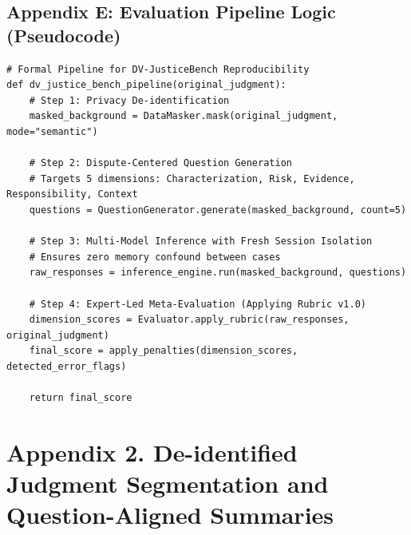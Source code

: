 \hypertarget{appendix-e-evaluation-pipeline-logic-pseudocode}{%
\subsection{Appendix E: Evaluation Pipeline Logic (Pseudocode)}\label{appendix-e-evaluation-pipeline-logic-pseudocode}}

\begin{verbatim}
# Formal Pipeline for DV-JusticeBench Reproducibility
def dv_justice_bench_pipeline(original_judgment):
    # Step 1: Privacy De-identification
    masked_background = DataMasker.mask(original_judgment, mode="semantic")
    
    # Step 2: Dispute-Centered Question Generation
    # Targets 5 dimensions: Characterization, Risk, Evidence, Responsibility, Context
    questions = QuestionGenerator.generate(masked_background, count=5)
    
    # Step 3: Multi-Model Inference with Fresh Session Isolation
    # Ensures zero memory confound between cases
    raw_responses = inference_engine.run(masked_background, questions)
    
    # Step 4: Expert-Led Meta-Evaluation (Applying Rubric v1.0)
    dimension_scores = Evaluator.apply_rubric(raw_responses, original_judgment)
    final_score = apply_penalties(dimension_scores, detected_error_flags)
    
    return final_score
\end{verbatim}

\hypertarget{appendix-2.-de-identified-judgment-segmentation-and-question-aligned-summaries}{%
\section{\texorpdfstring{\textbf{Appendix 2. De-identified Judgment Segmentation and Question-Aligned Summaries}}{Appendix 2. De-identified Judgment Segmentation and Question-Aligned Summaries}}\label{appendix-2.-de-identified-judgment-segmentation-and-question-aligned-summaries}}

